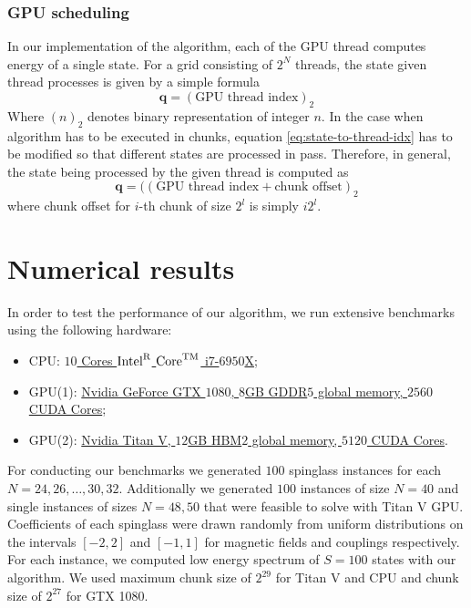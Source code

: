 \subsubsection{GPU scheduling}
In our implementation of the algorithm, each of the GPU thread computes energy of a single state. For a grid consisting of $2^N$ threads, the state given thread processes is given by a simple formula
\begin{equation}
\label{eq:state-to-thread-idx}
    \mathbf{q} = (\mbox{GPU thread index})_2
\end{equation}
Where $(n)_2$ denotes binary representation of integer $n$. In the case when algorithm has to be executed in chunks, equation \eqref{eq:state-to-thread-idx} has to be modified so that different states are processed in pass. Therefore, in general, the state being processed by the given thread is computed as
\begin{equation}
\mathbf{q} = ((\mbox{GPU thread index} + \mbox{chunk offset})_2
\end{equation}
where chunk offset for $i$-th chunk of size $2^l$ is simply $i2^l$. 
\section{Numerical results}
In order to test the performance of our algorithm, we run extensive benchmarks using the following hardware:
%
\begin{itemize}
\item CPU: \href{https://ark.intel.com/products/94456/Intel-Core-i7-6950X-Processor-Extreme-Edition-25M-Cache-up-to-3-50-GHz-}{$10$ Cores ${\rm Intel}^{\rm R}$ ${\rm Core}^{\rm TM}$ i7-$6950$X};
%
\item GPU(1): \href{https://www.nvidia.com/en-us/geforce/products/10series/geforce-gtx-1080}{Nvidia GeForce GTX $1080$, $8$GB GDDR$5$ global memory, $2560$ CUDA Cores};
%
\item  GPU(2): \href{https://www.nvidia.com/en-us/titan/titan-v/}{Nvidia Titan V, $12$GB HBM$2$ global memory, $5120$ CUDA Cores}.
\end{itemize}

For conducting our benchmarks we generated $100$ spinglass instances for each $N=24, 26, \ldots, 30, 32$. Additionally we generated $100$ instances of size $N=40$ and single instances of sizes $N=48, 50$ that were feasible to solve with Titan V GPU. Coefficients of each spinglass were drawn randomly from uniform distributions on the intervals $[-2, 2]$ and $[-1, 1]$ for magnetic fields and couplings respectively. For each instance, we computed low energy spectrum of $S=100$ states with our algorithm. We used maximum chunk size of $2^{29}$ for Titan V and CPU and chunk size of $2^{27}$ for GTX 1080.

